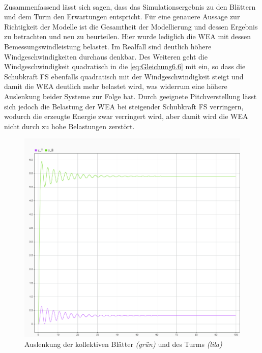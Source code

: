 \\
Zusammenfassend lässt sich sagen, dass das Simulationsergebnis zu den Blättern und dem Turm den Erwartungen entspricht. Für eine genauere Aussage zur Richtigkeit der Modelle ist die Gesamtheit der Modellierung und dessen Ergebnis zu betrachten und neu zu beurteilen. Hier wurde lediglich die WEA mit dessen Bemessungswindleistung belastet. Im Realfall sind deutlich höhere Windgeschwindigkeiten durchaus denkbar. Des Weiteren geht die Windgeschwindigkeit quadratisch in die \autoref{eq:Gleichung6.6} mit ein, so dass die Schubkraft \acs{FS} ebenfalls quadratisch mit der Windgeschwindigkeit steigt und damit die WEA deutlich mehr belastet wird, was widerrum eine höhere Auslenkung beider Systeme zur Folge hat. Durch geeignete Pitchverstellung lässt sich jedoch die Belastung der WEA bei steigender Schubkraft \acs{FS} verringern, wodurch die erzeugte Energie zwar verringert wird, aber damit wird die WEA nicht durch zu hohe Belastungen zerstört. 

 \begin{figure}[H]
    \centering
    \includegraphics[scale=0.68]{Bilder/Kapitel 6/Auslenkung_Blatt_Turm_Simulation.png}
    \caption{Auslenkung der kollektiven Blätter \textit{(grün)} und des Turms \textit{(lila)}}
    \label{fig:AuslenkungTurmBlatt}
\end{figure}

 
 
 